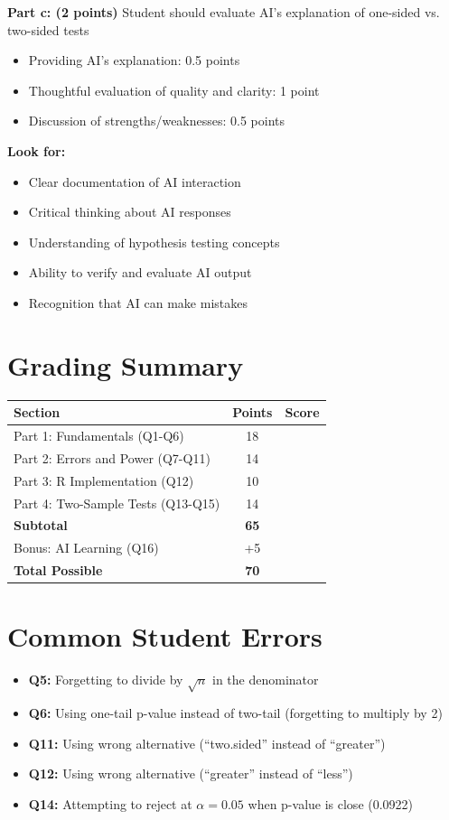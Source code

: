 \documentclass[11pt]{article}
\begin{document}
\textbf{Part c: (2 points)} Student should evaluate AI's explanation of one-sided vs. two-sided tests
\begin{itemize}
\item Providing AI's explanation: 0.5 points
\item Thoughtful evaluation of quality and clarity: 1 point
\item Discussion of strengths/weaknesses: 0.5 points
\end{itemize}

\textbf{Look for:}
\begin{itemize}
\item Clear documentation of AI interaction
\item Critical thinking about AI responses
\item Understanding of hypothesis testing concepts
\item Ability to verify and evaluate AI output
\item Recognition that AI can make mistakes
\end{itemize}

\section*{Grading Summary}

\begin{table}[h]
\centering
\begin{tabular}{lcc}
\toprule
\textbf{Section} & \textbf{Points} & \textbf{Score} \\
\midrule
Part 1: Fundamentals (Q1-Q6) & 18 & \\
Part 2: Errors and Power (Q7-Q11) & 14 & \\
Part 3: R Implementation (Q12) & 10 & \\
Part 4: Two-Sample Tests (Q13-Q15) & 14 & \\
\midrule
\textbf{Subtotal} & \textbf{65} & \\
Bonus: AI Learning (Q16) & +5 & \\
\midrule
\textbf{Total Possible} & \textbf{70} & \\
\bottomrule
\end{tabular}
\end{table}

\section*{Common Student Errors}

\begin{itemize}
\item \textbf{Q5:} Forgetting to divide by $\sqrt{n}$ in the denominator
\item \textbf{Q6:} Using one-tail p-value instead of two-tail (forgetting to multiply by 2)
\item \textbf{Q11:} Using wrong alternative (``two.sided'' instead of ``greater'')
\item \textbf{Q12:} Using wrong alternative (``greater'' instead of ``less'')
\item \textbf{Q14:} Attempting to reject at $\alpha = 0.05$ when p-value is close (0.0922)
\end{itemize}
\end{document}
